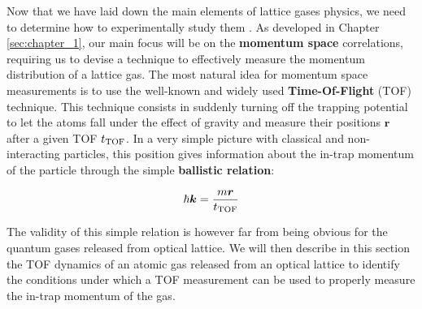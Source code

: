 Now that we have laid down the main elements of lattice gases physics, we need to determine how to experimentally study them . As developed in Chapter \ref{sec:chapter_1}, our main focus will be on the \textbf{momentum space} correlations, requiring us to devise a technique to effectively measure the momentum distribution of a lattice gas. The most natural idea for momentum space measurements is to use the well-known and widely used \textbf{Time-Of-Flight} (TOF) technique. This technique consists in suddenly turning off the trapping potential to let the atoms fall under the effect of gravity and measure their positions $\bm{r}$ after a given TOF $t_{\rm{TOF}}$. In a very simple picture with classical and non-interacting particles, this position gives information about the in-trap momentum of the particle through the simple \textbf{ballistic relation}:

\begin{equation}
    \hbar \bm{k} = \frac{m \bm{r}}{t_{\rm{TOF}}}
\end{equation}

The validity of this simple relation is however far from being obvious for the quantum gases released from optical lattice. We will then describe in this section the TOF dynamics of an atomic gas released from an optical lattice to identify the conditions under which a TOF measurement can be used to properly measure the in-trap momentum of the gas.





